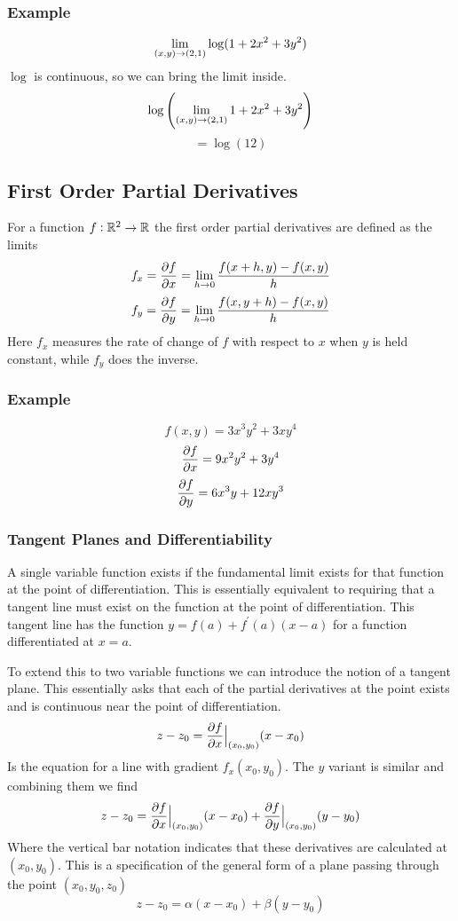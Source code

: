 \documentclass[12pt]{report}
\begin{document}
\begin{flushleft}
\subsubsection*{Example}

\begin{center}
    \[\lim\limits_{(x, y) \rightarrow (2, 1)} \log(1 + 2x^2 + 3y^2)\]
    \(\log\) is continuous, so we can bring the limit inside.
    \[\log\left(\lim\limits_{(x, y) \rightarrow (2, 1)} 1 + 2x^2 + 3y^2\right)\]
    \[= \log(12)\]
\end{center}

\subsection*{First Order Partial Derivatives}

For a function \(f: \mathbb{R}^2 \rightarrow \mathbb{R}\) the first order partial derivatives
are defined as the limits
\[f_x = \frac{\partial f}{\partial x} = \lim\limits_{h \rightarrow 0}\frac{f(x + h, y) - f(x, y)}{h}\]
\[f_y = \frac{\partial f}{\partial y} = \lim\limits_{h \rightarrow 0}\frac{f(x, y + h) - f(x, y)}{h}\]
Here \(f_x\) measures the rate of change of \(f\) with respect to \(x\) when
\(y\) is held constant, while \(f_y\) does the inverse.

\subsubsection*{Example}
\[f(x, y) = 3x^3y^2 + 3xy^4\]
\[\frac{\partial f}{\partial x} = 9x^2y^2 + 3y^4\]
\[\frac{\partial f}{\partial y} = 6x^3y + 12xy^3\]

\subsubsection*{Tangent Planes and Differentiability}

A single variable function exists if the fundamental limit exists for that
function at the point of differentiation. This is essentially equivalent to
requiring that a tangent line must exist on the function at the point of
differentiation. This tangent line has the function
\(y = f(a) + f^\prime(a)(x - a)\) for a function differentiated at \(x = a\).
\par
To extend this to two variable functions we can introduce the notion of a
tangent plane. This essentially asks that each of the partial derivatives
at the point exists and is continuous near the point of differentiation.
\[z - z_0 = \frac{\partial f}{\partial x}\Bigr\rvert_{(x_0, y_0)}(x - x_0)\]
Is the equation for a line with gradient \(f_x(x_0, y_0)\). The \(y\) variant
is similar and combining them we find 
\[z - z_0 = \frac{\partial f}{\partial x}\Bigr\rvert_{(x_0, y_0)}(x - x_0) 
+ \frac{\partial f}{\partial y}\Bigr\rvert_{(x_0, y_0)}(y - y_0)\]
Where the vertical bar notation indicates that these derivatives are calculated
at \((x_0, y_0)\). This is a specification of the general form of a plane
passing through the point \((x_0, y_0, z_0)\)
\[z - z_0 = \alpha(x - x_0) + \beta(y - y_0)\]


\end{flushleft}
\end{document}
